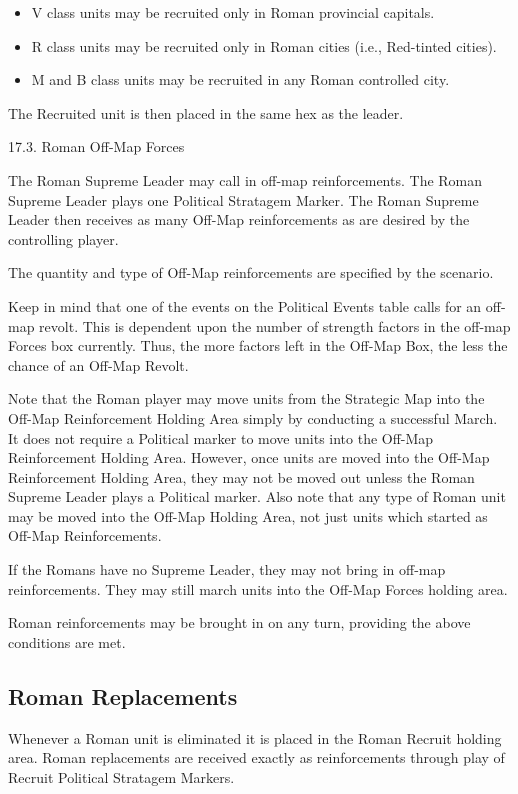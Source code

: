 \begin{itemize}
  \item V class units may be recruited only in Roman provincial capitals.
  \item R class units may be recruited only in Roman cities (i.e., Red-tinted cities).
  \item M and B class units may be recruited in any Roman controlled city.
\end{itemize}

The Recruited unit is then placed in the same hex as the leader.

17.3. Roman Off-Map Forces

The Roman Supreme Leader may call in off-map reinforcements. The Roman Supreme Leader plays one Political Stratagem Marker. The Roman Supreme Leader then receives as many Off-Map reinforcements as are desired by the controlling player.

The quantity and type of Off-Map reinforcements are specified by the scenario.

Keep in mind that one of the events on the Political Events table calls for an off-map revolt. This is dependent upon the number of strength factors in the off-map Forces box currently. Thus, the more factors left in the Off-Map Box, the less the chance of an Off-Map Revolt.

Note that the Roman player may move units from the Strategic Map into the Off-Map Reinforcement Holding Area simply by conducting a successful March. It does not require a Political marker to move units into the Off-Map Reinforcement Holding Area. However, once units are moved into the Off-Map Reinforcement Holding Area, they may not be moved out unless the Roman Supreme Leader plays a Political marker. Also note that any type of Roman unit may be moved into the Off-Map Holding Area, not just units which started as Off-Map Reinforcements.

If the Romans have no Supreme Leader, they may not bring in off-map reinforcements. They may still march units into the Off-Map Forces holding area.

Roman reinforcements may be brought in on any turn, providing the above conditions are met.

\subsection{Roman Replacements}

Whenever a Roman unit is eliminated it is placed in the Roman Recruit holding area. Roman replacements are received exactly as reinforcements through play of Recruit Political Stratagem Markers.

